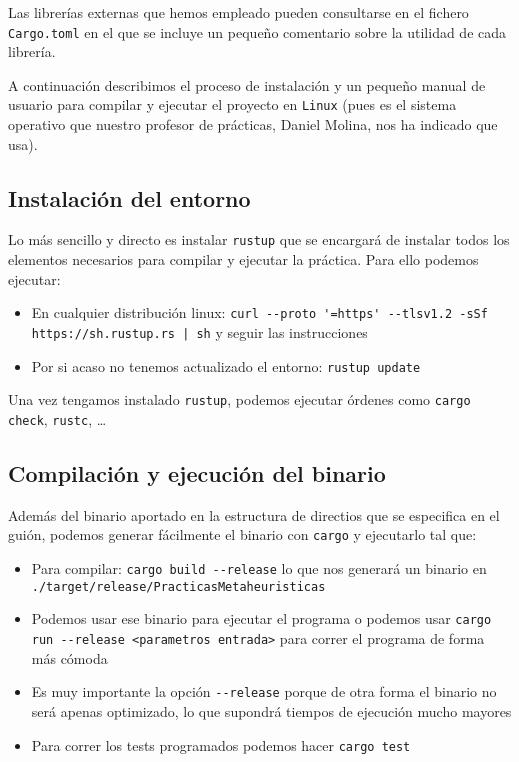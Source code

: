 \documentclass[11pt]{article}
\begin{document}
Las librerías externas que hemos empleado pueden consultarse en el fichero \lstinline{Cargo.toml} en el que se incluye un pequeño comentario sobre la utilidad de cada librería.

A continuación describimos el proceso de instalación y un pequeño manual de usuario para compilar y ejecutar el proyecto en \lstinline{Linux} (pues es el sistema operativo que nuestro profesor de prácticas, Daniel Molina, nos ha indicado que usa).

\subsection{Instalación del entorno}

Lo más sencillo y directo es instalar \lstinline{rustup} \footnotemark que se encargará de instalar todos los elementos necesarios para compilar y ejecutar la práctica. Para ello podemos ejecutar:

\begin{itemize}
    \item En cualquier distribución linux: \lstinline{curl --proto '=https' --tlsv1.2 -sSf https://sh.rustup.rs | sh} y seguir las instrucciones
    \item Por si acaso no tenemos actualizado el entorno: \lstinline{rustup update}
\end{itemize}

Una vez tengamos instalado \lstinline{rustup}, podemos ejecutar órdenes como \lstinline{cargo check}, \lstinline{rustc}, \ldots


\subsection{Compilación y ejecución del binario}

Además del binario aportado en la estructura de directios que se especifica en el guión, podemos generar fácilmente el binario con \lstinline{cargo} y ejecutarlo tal que:

\begin{itemize}
    \item Para compilar: \lstinline{cargo build --release} lo que nos generará un binario en \lstinline{./target/release/PracticasMetaheuristicas}
    \item Podemos usar ese binario para ejecutar el programa o podemos usar \lstinline{cargo run --release <parametros entrada>} para correr el programa de forma más cómoda
    \item Es muy importante la opción \lstinline{--release} porque de otra forma el binario no será apenas optimizado, lo que supondrá tiempos de ejecución mucho mayores
    \item Para correr los tests programados podemos hacer \lstinline{cargo test}
\end{itemize}
\end{document}
